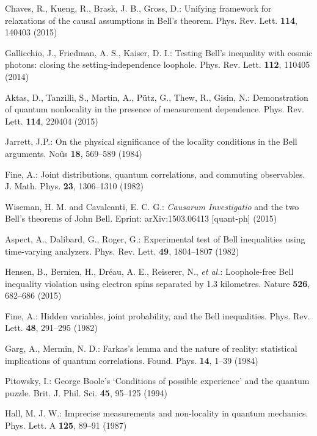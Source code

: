 \documentclass[graybox]{svmult}
\begin{document}
{\begin{thebibliography}{99}
 Chaves, R., Kueng, R., Brask, J. B., Gross, D.: Unifying framework for relaxations of the causal assumptions in Bell's theorem. Phys. Rev. Lett. {\bf 114}, 140403 (2015)

 Gallicchio, J., Friedman, A. S., Kaiser, D. I.: Testing Bell's inequality with cosmic photons: closing the setting-independence loophole. Phys. Rev. Lett. {\bf 112}, 110405 (2014)

  Aktas, D., Tanzilli, S., Martin, A., P\"utz, G., Thew, R., Gisin, N.: Demonstration of quantum nonlocality in the presence of measurement dependence. Phys. Rev. Lett. {\bf 114}, 220404 (2015)

 Jarrett, J.P.: On the physical significance of the locality conditions in the Bell arguments. No\^us {\bf 18}, 569--589 (1984)

 Fine, A.: Joint distributions, quantum correlations, and commuting observables. J. Math. Phys. {\bf 23}, 1306--1310 (1982)

 Wiseman, H. M. and Cavalcanti, E. C. G.: {\it Causarum Investigatio} and the two Bell's theorems of John Bell. Eprint: arXiv:1503.06413 [quant-ph] (2015)
		
 Aspect, A., Dalibard, G., Roger, G.: Experimental test of Bell inequalities using time-varying analyzers. Phys. Rev. Lett. {\bf 49}, 1804--1807 (1982)
			
Hensen, B., Bernien, H., Dr\'eau, A. E., Reiserer, N., {\it et al.}: Loophole-free Bell inequality violation using electron spins separated by 1.3 kilometres. Nature {\bf 526}, 682--686 (2015)

 Fine, A.: Hidden variables, joint probability, and the Bell inequalities. Phys. Rev. Lett. {\bf 48}, 291--295 (1982)

 Garg, A., Mermin, N. D.: Farkas's lemma and the nature of reality: statistical implications of quantum correlations. Found. Phys. {\bf 14}, 1--39 (1984)

 Pitowsky, I.: George Boole's `Conditions of possible experience' and the quantum puzzle. Brit. J. Phil. Sci. {\bf 45}, 95--125 (1994)

 Hall, M. J. W.: Imprecise measurements and non-locality in quantum mechanics. Phys. Lett. A {\bf 125}, 89--91 (1987)
		
						

\end{thebibliography}}
\end{document}
